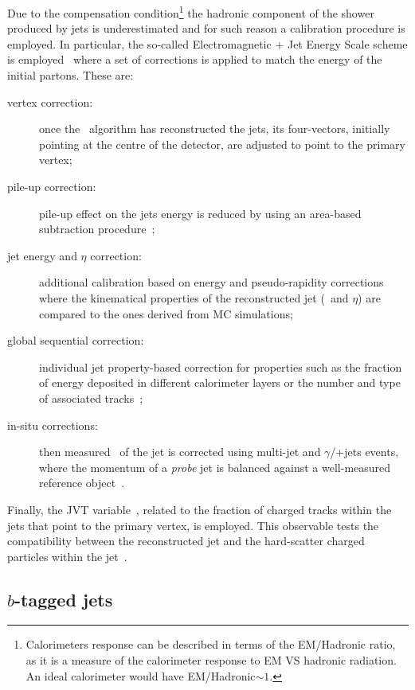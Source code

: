 			Due to the compensation condition\footnote{Calorimeters response can be described in terms of the \ac{EM}/Hadronic ratio, as it is a measure of the calorimeter response to \ac{EM} VS hadronic radiation. An ideal calorimeter would have \ac{EM}/Hadronic$\sim1$.} the hadronic component of the shower produced by jets is underestimated and for such reason a calibration procedure is employed. In particular, the so-called Electromagnetic + Jet Energy Scale scheme is employed~\cite{ATL-PHYS-PUB-2015-015} where a set of corrections is applied to match the energy of the initial partons. These are:
			\begin{description}
				\item[vertex correction:] once the \antikt\ algorithm has reconstructed the jets, its four-vectors, initially pointing at the centre of the detector, are adjusted to point to the primary vertex; 
				\item[pile-up correction:] pile-up effect on the jets energy is reduced by using an area-based subtraction procedure~\cite{TheATLAScollaboration:2013pia}; 
				\item[jet energy and $\eta$ correction:] additional calibration based on energy and pseudo-rapidity corrections where the kinematical properties of the reconstructed jet (\pt\ and $\eta$) are compared to the ones derived from \ac{MC} simulations; 
				\item[global sequential correction:] individual jet property-based correction for properties such as the fraction of energy deposited in different calorimeter layers or the number and type of associated tracks~\cite{ATLAS:2015oia}; 
				\item[in-situ corrections:] then measured \pt\ of the jet is corrected using multi-jet and $\gamma$/\Zboson+jets events, where the momentum of a \emph{probe} jet is balanced against a well-measured reference object~\cite{ATLAS-CONF-2015-017}.
			\end{description}

			Finally, the \ac{JVT} variable~\cite{ATLAS-CONF-2014-018}, related to the fraction of charged tracks within the jets that point to the primary vertex, is employed. This observable tests the compatibility between the reconstructed jet and the hard-scatter charged particles within the jet~\cite{Aaboud:2017pou}.


		\subsection*{$b$-tagged jets}

